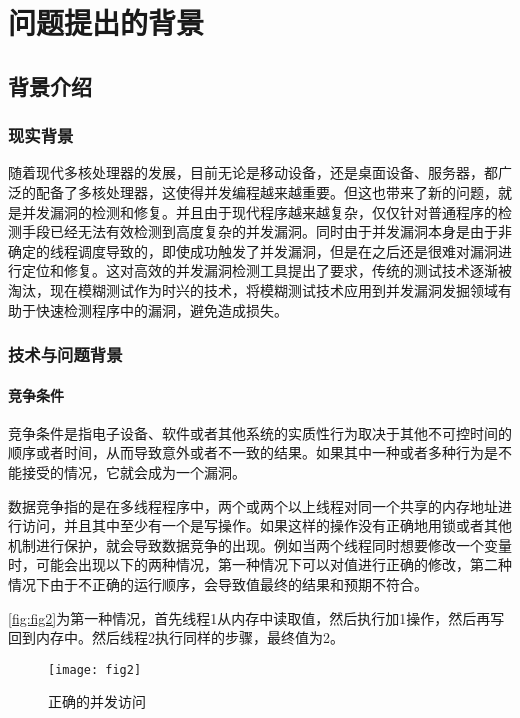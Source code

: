\section{问题提出的背景}

\subsection{背景介绍}

\subsubsection{现实背景}

随着现代多核处理器的发展，目前无论是移动设备，还是桌面设备、服务器，都广泛的配备了多核处理器，这使得并发编程越来越重要。但这也带来了新的问题，就是并发漏洞的检测和修复。并且由于现代程序越来越复杂，仅仅针对普通程序的检测手段已经无法有效检测到高度复杂的并发漏洞。同时由于并发漏洞本身是由于非确定的线程调度导致的，即使成功触发了并发漏洞，但是在之后还是很难对漏洞进行定位和修复。这对高效的并发漏洞检测工具提出了要求，传统的测试技术逐渐被淘汰，现在模糊测试作为时兴的技术，将模糊测试技术应用到并发漏洞发掘领域有助于快速检测程序中的漏洞，避免造成损失。

\subsubsection{技术与问题背景}

\paragraph{竞争条件}竞争条件是指电子设备、软件或者其他系统的实质性行为取决于其他不可控时间的顺序或者时间，从而导致意外或者不一致的结果。如果其中一种或者多种行为是不能接受的情况，它就会成为一个漏洞\cite{wikipediaRaceCondition}。

数据竞争指的是在多线程程序中，两个或两个以上线程对同一个共享的内存地址进行访问，并且其中至少有一个是写操作。如果这样的操作没有正确地用锁或者其他机制进行保护，就会导致数据竞争的出现。例如当两个线程同时想要修改一个变量时，可能会出现以下的两种情况，第一种情况下可以对值进行正确的修改，第二种情况下由于不正确的运行顺序，会导致值最终的结果和预期不符合。

\autoref{fig:fig2}为第一种情况，首先线程1从内存中读取值，然后执行加1操作，然后再写回到内存中。然后线程2执行同样的步骤，最终值为2。

\begin{figure}[ht]
    \centering
    \texttt{[image: fig2]}
    \caption{\label{fig:fig2}正确的并发访问}
\end{figure}

